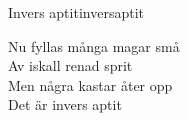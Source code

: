 \begin{song}{Invers aptit}{inversaptit}
\begin{vers}
Nu fyllas många magar små\\
Av iskall renad sprit\\
Men några kastar åter opp\\
Det är invers aptit\\
\end{vers}
\end{song}
